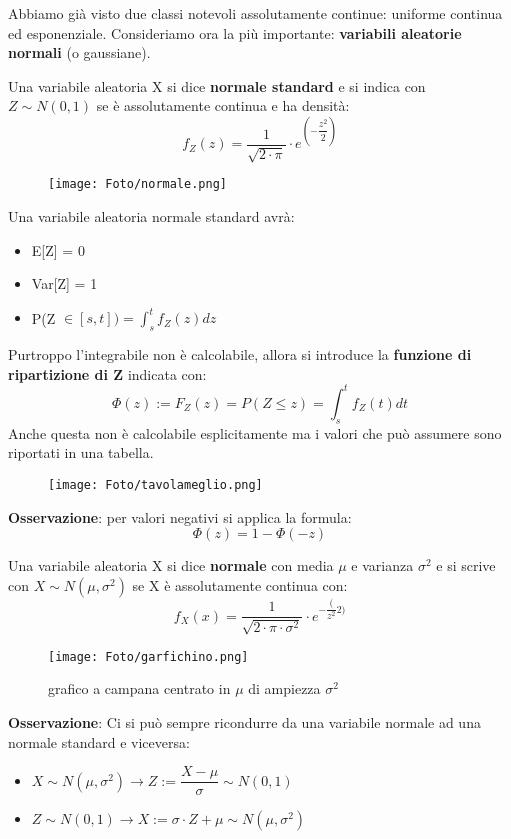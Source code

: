 Abbiamo già visto due classi notevoli assolutamente continue: uniforme continua ed esponenziale. Consideriamo ora la più importante: \textbf{variabili aleatorie normali } (o gaussiane).

\noindent Una variabile aleatoria X si dice \textbf{normale standard} e si indica con \newline $Z \sim N(0,1)$ se è assolutamente continua e ha densità: $$f_Z(z) = \dfrac{1}{\sqrt{2 \cdot \pi}} \cdot e^{\left(-\dfrac{z^2}{2} \right)}$$

\begin{figure}[h!]
    \centering
    \texttt{[image: Foto/normale.png]}
\end{figure}

\noindent Una variabile aleatoria normale standard avrà:
\begin{itemize}
    \item E[Z] = 0
    \item Var[Z] = 1 
    \item P(Z $\in [s,t]) = \displaystyle\int_s^t f_Z(z)dz$
\end{itemize}

\noindent Purtroppo l'integrabile non è calcolabile, allora si introduce la \textbf{funzione di ripartizione di Z} indicata con:  $$ \Phi(z) := F_Z(z) = P(Z \leq z) = \int_s^t f_Z(t)dt$$ Anche questa non è calcolabile esplicitamente ma i valori che può assumere sono riportati in una tabella. \newline

\begin{figure}[h!]
    \centering
    \texttt{[image: Foto/tavolameglio.png]}
\end{figure} 
\newpage
\noindent \textbf{Osservazione}: per valori negativi si applica la formula: $$\Phi(z) = 1 - \Phi(-z)$$

\newpage
\noindent Una variabile aleatoria X si dice \textbf{normale} con media $\mu$ e varianza $\sigma^2$ e si scrive con $X \sim N(\mu, \sigma^2)$ se X è assolutamente continua con: $$f_X(x) = \dfrac{1}{\sqrt{2 \cdot \pi \cdot \sigma^2}} \cdot e^{-\dfrac({z^2}{2})}$$

\begin{figure}[h!]
    \centering
    \texttt{[image: Foto/garfichino.png]}
    \color{gray}
    \caption{grafico a campana centrato in $\mu$ di ampiezza $\sigma^2$}
\end{figure}

\noindent \textbf{Osservazione}: Ci si può sempre ricondurre da una variabile normale ad una normale standard e viceversa:
\begin{itemize}
    \item $X \sim N(\mu, \sigma^2) \rightarrow{} Z:= \dfrac{X - \mu}{\sigma} \sim N(0,1)$ 
    \item $Z \sim N(0,1) \xrightarrow{} X := \sigma \cdot Z + \mu \sim N(\mu, \sigma^2)$
\end{itemize}

